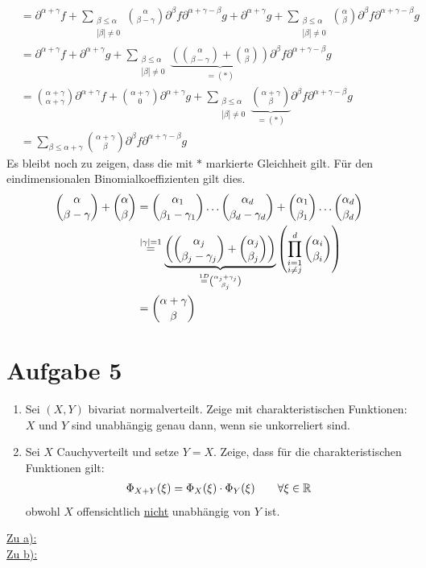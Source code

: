 \documentclass[12pt,a4paper]{article}
\begin{document}
\begin{lösung}
\begin{align*}
	&= \partial^{\alpha +\gamma}f + \displaystyle \sum_{\substack{\beta \leq \alpha \\ |\beta|\neq 0}} \binom{\alpha }{\beta - \gamma} \partial^{\beta} f \partial^{\alpha +\gamma -\beta}g + \partial^{\alpha +\gamma}g + \displaystyle \sum_{\substack{\beta \leq \alpha \\ |\beta|\neq 0 }} \binom{\alpha }{\beta}  \partial^{\beta} f \partial^{\alpha +\gamma -\beta}g\\
	&= \partial^{\alpha +\gamma}f + \partial^{\alpha +\gamma}g + \displaystyle \sum_{\substack{\beta \leq \alpha \\ |\beta|\neq 0}} \underbrace{\left( \binom{\alpha }{\beta - \gamma} + \binom{\alpha }{\beta} \right)}_{=(*)} \partial^{\beta} f \partial^{\alpha +\gamma -\beta}g\\
	&= \binom{\alpha +\gamma}{\alpha +\gamma}\partial^{\alpha +\gamma}f + \binom{\alpha +\gamma}{0}\partial^{\alpha +\gamma}g + \displaystyle \sum_{\substack{\beta \leq \alpha \\ |\beta|\neq 0}}  \underbrace{\binom{\alpha + \gamma}{\beta}}_{=(*)} \partial^{\beta} f \partial^{\alpha +\gamma -\beta}g\\
	&=\displaystyle \sum_{\beta \leq \alpha + \gamma} \binom{\alpha + \gamma}{\beta}\partial^\beta f \partial^{\alpha+\gamma -\beta}g
\end{align*}
Es bleibt noch zu zeigen, dass die mit $*$ markierte Gleichheit gilt. Für den eindimensionalen Binomialkoeffizienten gilt dies.
\begin{align*}
	\binom{\alpha }{\beta - \gamma} + \binom{\alpha }{\beta} &=  \binom{\alpha_1 }{\beta_1 - \gamma_1}\dots \binom{\alpha_d }{\beta_d - \gamma_d} + \binom{\alpha_1 }{\beta_1}\dots \binom{\alpha_d }{\beta_d}\\
																													 &\stackrel{|\gamma|=1}{=} \underbrace{\left( \binom{\alpha_j}{\beta_j -\gamma_j} + \binom{\alpha_j}{\beta_j} \right)}_{\stackrel{1D}{=}\binom{\alpha_j + \gamma_j}{\beta_j}} \left( \prod \limits^d_{\substack{i=1 \\ i\neq j}} \binom{\alpha_i}{\beta_i} \right)\\
	&= \binom{\alpha +\gamma }{\beta}
\end{align*}
\end{lösung}

\section*{Aufgabe 5}
\begin{enumerate}[label=\alph*)]
\item Sei $(X,Y)$ bivariat normalverteilt. Zeige mit charakteristischen Funktionen: $X$ und $Y$ sind unabhängig genau dann, wenn sie unkorreliert sind.
\item Sei $X$ Cauchyverteilt und setze $Y=X$. Zeige, dass für die charakteristischen Funktionen gilt:
\begin{align*}
\Phi_{X+Y}(\xi)=\Phi_X(\xi)\cdot\Phi_Y(\xi)\qquad\forall\xi\in\mathbb{R}
\end{align*} 
obwohl $X$ offensichtlich \ul{nicht} unabhängig von $Y$ ist.
\end{enumerate}

\begin{lösung}
\underline{Zu a):}\\
\underline{Zu b):}\\
\end{lösung}
\end{document}
